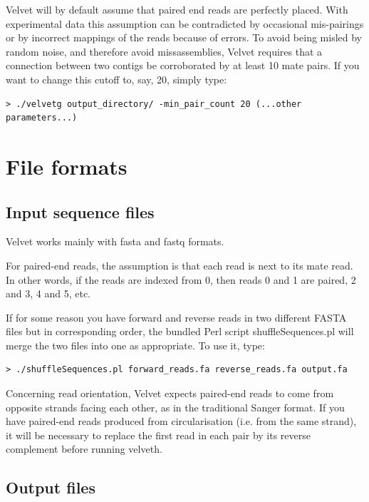 \documentclass{article}
\begin{document}
Velvet will by default assume that paired end reads are perfectly placed. With experimental data this assumption can be contradicted by occasional mis-pairings or by incorrect mappings of the reads because of errors. To avoid being misled by random noise, and therefore avoid missassemblies, Velvet requires that a connection between two contigs be corroborated by at least 10 mate pairs. If you want to change this cutoff to, say, 20, simply type:

\begin{verbatim}
> ./velvetg output_directory/ -min_pair_count 20 (...other parameters...)
\end{verbatim}  

\section{File formats}

\subsection{Input sequence files}

\label{sec:pairedformat}

Velvet works mainly with fasta and fastq formats. 

For paired-end reads, the assumption is that each read is next to its mate
read. In other words, if the reads are indexed from 0, then reads 0 and 1 are
paired, 2 and 3, 4 and 5, etc.  

If for some reason you have forward and reverse reads in two different FASTA files
but in corresponding order, the bundled Perl script shuffleSequences.pl will
merge the two files into one as appropriate. To use it, type:
\begin{verbatim}
> ./shuffleSequences.pl forward_reads.fa reverse_reads.fa output.fa
\end{verbatim}

Concerning read orientation, Velvet expects paired-end reads to come from opposite strands facing each other, as in the traditional Sanger format. If you have paired-end reads produced from circularisation (i.e. from the same strand), it will be necessary to replace the first read in each pair by its reverse complement before running velveth.

\subsection{Output files} 
\end{document}

